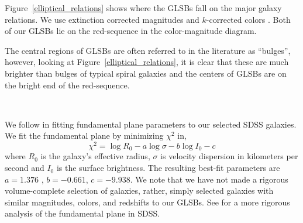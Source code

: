 \documentclass{emulateapj}
\begin{document}

Figure~\ref{elliptical_relations} shows where the GLSBs fall on the major galaxy relations.  We use extinction corrected magnitudes and $k$-corrected colors \citep{Chilingarian10}.  Both of our GLSBs lie on the red-sequence in the color-magnitude diagram.  

The central regions of GLSBs are often referred to in the literature as ``bulges'', however, looking at Figure~\ref{elliptical_relations}, it is clear that these are much brighter than bulges of typical spiral galaxies and the centers of GLSBs are on the bright end of the red-sequence.  

\begin{figure*}
\\
\caption{
Top Left:  The color-magnitude diagram for 141,000 galaxies of similar redshift and magnitude as Malin~2 and UGC~6614.  Top Right:  The Faber-Jackson relation for 45,700 SDSS galaxies, along with a best-fit line.  Left:  The $r$-band fundamental plane from SDSS along with our GLSB galaxies and best-fit line.  Bottom Right:  The relation between central velocity dispersion and the Mg2 absorption feature.   From the point of view of the SDSS data reduction pipeline, GLSB galaxies appear as relatively normal red elliptical galaxies.  \label{elliptical_relations}}
\end{figure*}

We follow \citet{Bernardi03,Bernardi03b} in fitting fundamental plane parameters to our selected SDSS galaxies.  We fit the fundamental plane by minimizing $\chi^2$ in, 
\begin{equation}
\chi^2 = \log R_0 - a \log \sigma - b \log I_0 - c
\end{equation}
where $R_0$ is the galaxy's effective radius, $\sigma$ is velocity dispersion in kilometers per second and $I_0$ is the surface brightness.  The resulting best-fit parameters are  $a =1.376$ , $b = -0.661$, $c = -9.938$.  We note that we have not made a rigorous volume-complete selection of galaxies, rather, simply selected galaxies with similar magnitudes, colors, and redshifts to our GLSBs.   See \citet{Saulder13} for a more rigorous analysis of the fundamental plane in SDSS. 
\end{document}
